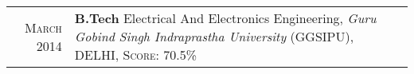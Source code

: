 %
%


\begin{tabular}{rl}	
	\textsc{March 2014}  			& \textbf{B.Tech} Electrical And Electronics Engineering, \emph{Guru Gobind Singh Indraprastha University} (GGSIPU), DELHI, \textsc{Score}: 70.5\% \\	
\end{tabular}


